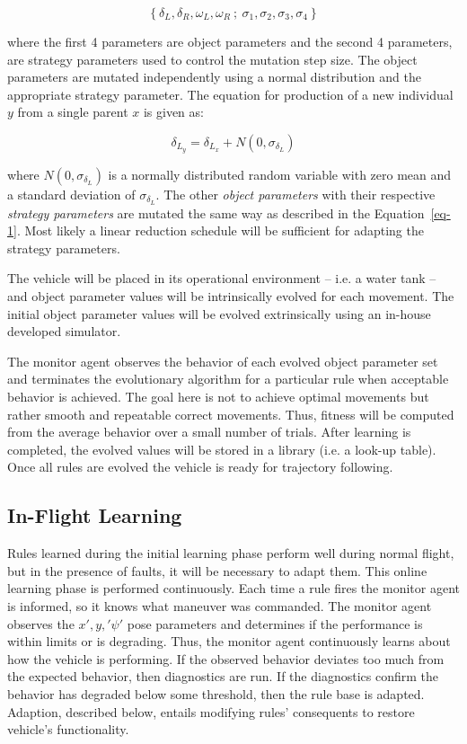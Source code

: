 \[\left\{ {{\delta _L},{\delta _R},{\omega _L},{\omega _R}\ ;\ {\sigma _1},{\sigma _2},{\sigma _3},{\sigma _4}} \right\}\]

\noindent where the first 4 parameters are object parameters and the second 4 parameters, are strategy parameters used to control the mutation step size. The object parameters are mutated independently using a normal distribution and the appropriate strategy parameter. The equation for production of a new individual $y$ from a single parent $x$ is given as:

\begin{equation}
\delta_{L_y} = \delta_{L_x} + N(0,\sigma_{\delta_L})
\label{eq-1}
\end{equation}

where $N(0,\sigma_{\delta_L})$ is a normally distributed random variable with zero mean and a standard deviation of $\sigma_{\delta_L}$. The other \textit{object parameters} with their respective \textit{strategy parameters} are mutated the same way as described in the Equation~\ref{eq-1}. Most likely a linear reduction schedule will be sufficient for adapting the strategy parameters.  

The vehicle will be placed in its operational environment -- i.e. a water tank -- and object parameter values will be intrinsically evolved for each movement. The initial object parameter values will be evolved extrinsically using an in-house developed simulator. %

The monitor agent observes the behavior of each evolved object parameter set and terminates the evolutionary algorithm for a particular rule when acceptable behavior is achieved. The goal here is not to achieve optimal movements but rather smooth and repeatable correct movements. Thus, fitness will be computed from the average behavior over a small number of trials. After learning is completed, the evolved values will be stored in a library (i.e. a look-up table). Once all rules are evolved the vehicle is ready for trajectory following.

\subsection{In-Flight Learning}
\label{subsec-SecondStageAdaptation}
Rules learned during the initial learning phase perform well during normal flight, but in the presence of faults, it will be necessary to adapt them. This online learning phase is performed continuously. Each time a rule fires the monitor agent is informed, so it knows what maneuver was commanded. The monitor agent observes the $x', y,' \psi'$ pose parameters and determines if the performance is within limits or is degrading. Thus, the monitor agent continuously learns about how the vehicle is performing. If the observed behavior deviates too much from the expected behavior, then diagnostics are run. If the diagnostics confirm the behavior has degraded below some threshold, then the rule base is adapted. Adaption, described below, entails modifying rules’ consequents to restore vehicle’s functionality.


